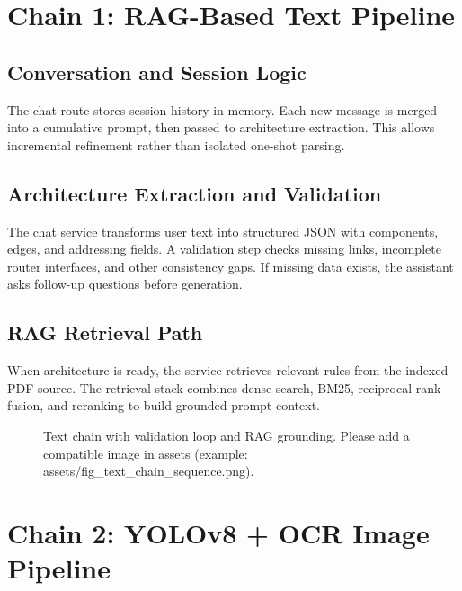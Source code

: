\documentclass[12pt,a4paper,openany]{report}
\begin{document}
\section{Chain 1: RAG-Based Text Pipeline}

\subsection{Conversation and Session Logic}

The chat route stores session history in memory. Each new message is merged into a cumulative prompt, then passed to architecture extraction. This allows incremental refinement rather than isolated one-shot parsing.

\subsection{Architecture Extraction and Validation}

The chat service transforms user text into structured JSON with components, edges, and addressing fields. A validation step checks missing links, incomplete router interfaces, and other consistency gaps. If missing data exists, the assistant asks follow-up questions before generation.

\subsection{RAG Retrieval Path}

When architecture is ready, the service retrieves relevant rules from the indexed PDF source. The retrieval stack combines dense search, BM25, reciprocal rank fusion, and reranking to build grounded prompt context.

\begin{figure}[H]
    \centering
    \caption{Text chain with validation loop and RAG grounding. Please add a compatible image in assets (example: assets/fig_text_chain_sequence.png).}
    \label{fig:text_chain_sequence}
\end{figure}

\section{Chain 2: YOLOv8 + OCR Image Pipeline}
\end{document}
